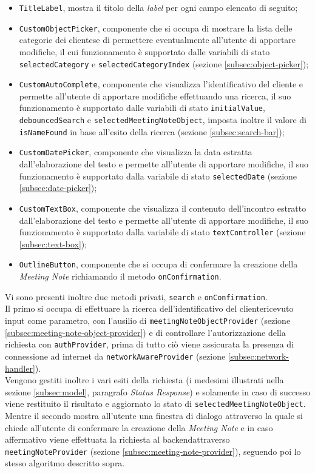 \begin{itemize}
    \item \lstinline{TitleLabel}, mostra il titolo della \emph{label} per ogni campo elencato di seguito;
    \item \lstinline{CustomObjectPicker}, componente che si occupa di mostrare la lista delle categorie dei \glspl{cliente}\glsoccur e di permettere eventualmente all'utente di apportare modifiche, il cui funzionamento è supportato dalle variabili di stato \lstinline{selectedCategory} e \lstinline{selectedCategoryIndex} (sezione \ref{subsec:object-picker});
    \item \lstinline{CustomAutoComplete}, componente che visualizza l'identificativo del cliente e permette all'utente di apportare modifiche effettuando una ricerca, il suo funzionamento è supportato dalle variabili di stato \lstinline{initialValue}, \lstinline{debouncedSearch} e \lstinline{selectedMeetingNoteObject}, imposta inoltre il valore di \lstinline{isNameFound} in base all'esito della ricerca (sezione \ref{subsec:search-bar});
    \item \lstinline{CustomDatePicker}, componente che visualizza la data estratta dall'elaborazione del testo e permette all'utente di apportare modifiche, il suo funzionamento è supportato dalla variabile di stato \lstinline{selectedDate} (sezione \ref{subsec:date-picker});
    \item \lstinline{CustomTextBox}, componente che visualizza il contenuto dell'incontro estratto dall'elaborazione del testo e permette all'utente di apportare modifiche, il suo funzionamento è supportato dalla variabile di stato \lstinline{textController} (sezione \ref{subsec:text-box});
    \item \lstinline{OutlineButton}\cite{site:outline-button}, componente che si occupa di confermare la creazione della \emph{Meeting Note} richiamando il metodo \lstinline{onConfirmation}.
\end{itemize}
Vi sono presenti inoltre due metodi privati, \lstinline{search} e \lstinline{onConfirmation}. \\
Il primo si occupa di effettuare la ricerca dell'identificativo del \gls{cliente}\glsoccur ricevuto input come parametro, con l'ausilio di \lstinline{meetingNoteObjectProvider} (sezione \ref{subsec:meeting-note-object-provider}) e di controllare l'autorizzazione della richiesta con \lstinline{authProvider}, prima di tutto ciò viene assicurata la presenza di connessione ad internet da \lstinline{networkAwareProvider} (sezione \ref{subsec:network-handler}). \\
Vengono gestiti inoltre i vari esiti della richiesta (i medesimi illustrati nella sezione \ref{subsec:model},  paragrafo \emph{Status Response}) e solamente in caso di successo viene restituito il risultato e aggiornato lo stato di \lstinline{selectedMeetingNoteObject}. \\
Mentre il secondo mostra all'utente una finestra di dialogo attraverso la quale si chiede all'utente di confermare la creazione della \emph{Meeting Note} e in caso affermativo viene effettuata la richiesta al \gls{backend}\glsoccur attraverso \lstinline{meetingNoteProvider} (sezione \ref{subsec:meeting-note-provider}), seguendo poi lo stesso algoritmo descritto sopra.

